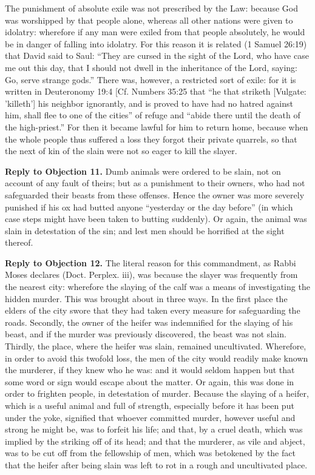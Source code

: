 The punishment of absolute exile was not prescribed by the Law: because God was worshipped by that people alone, whereas all other nations were given to idolatry: wherefore if any man were exiled from that people absolutely, he would be in danger of falling into idolatry. For this reason it is related (1 Samuel 26:19) that David said to Saul: ``They are cursed in the sight of the Lord, who have case me out this day, that I should not dwell in the inheritance of the Lord, saying: Go, serve strange gods.'' There was, however, a restricted sort of exile: for it is written in Deuteronomy 19:4 [Cf. Numbers 35:25 that ``he that striketh [Vulgate: 'killeth'] his neighbor ignorantly, and is proved to have had no hatred against him, shall flee to one of the cities'' of refuge and ``abide there until the death of the high-priest.'' For then it became lawful for him to return home, because when the whole people thus suffered a loss they forgot their private quarrels, so that the next of kin of the slain were not so eager to kill the slayer.

\textbf{Reply to Objection 11.} Dumb animals were ordered to be slain, not on account of any fault of theirs; but as a punishment to their owners, who had not safeguarded their beasts from these offenses. Hence the owner was more severely punished if his ox had butted anyone ``yesterday or the day before'' (in which case steps might have been taken to butting suddenly). Or again, the animal was slain in detestation of the sin; and lest men should be horrified at the sight thereof.

\textbf{Reply to Objection 12.} The literal reason for this commandment, as Rabbi Moses declares (Doct. Perplex. iii), was because the slayer was frequently from the nearest city: wherefore the slaying of the calf was a means of investigating the hidden murder. This was brought about in three ways. In the first place the elders of the city swore that they had taken every measure for safeguarding the roads. Secondly, the owner of the heifer was indemnified for the slaying of his beast, and if the murder was previously discovered, the beast was not slain. Thirdly, the place, where the heifer was slain, remained uncultivated. Wherefore, in order to avoid this twofold loss, the men of the city would readily make known the murderer, if they knew who he was: and it would seldom happen but that some word or sign would escape about the matter. Or again, this was done in order to frighten people, in detestation of murder. Because the slaying of a heifer, which is a useful animal and full of strength, especially before it has been put under the yoke, signified that whoever committed murder, however useful and strong he might be, was to forfeit his life; and that, by a cruel death, which was implied by the striking off of its head; and that the murderer, as vile and abject, was to be cut off from the fellowship of men, which was betokened by the fact that the heifer after being slain was left to rot in a rough and uncultivated place.


